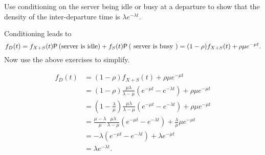 \begin{extra}\label{ex:63}
Use conditioning on the server being idle or busy at a departure to show that  the density of  the inter-departure time is $\lambda e^{-\lambda t}$.
  \begin{hint}
Conditioning leads to 
\begin{equation*}
    f_D(t) = f_{X+S}(t) \P{\text{server is idle}} + f_S(t) \P{\text{ server is busy }}= (1-\rho) f_{X+S}(t) +
    \rho \mu e^{-\mu t}.
\end{equation*}
    Now use the above exercises to simplify.
  \end{hint}
  \begin{solution}
       \begin{align*}
    f_D(t) 
&= (1-\rho) f_{X+S}(t) +    \rho \mu e^{-\mu t} \\
&= (1-\rho) \frac{\mu\lambda}{\lambda-\mu} \left(e^{-\mu t}-e^{-\lambda t}\right) +    \rho \mu e^{-\mu t} \\
&= \left(1-\frac{\lambda}\mu\right) \frac{\mu\lambda}{\lambda-\mu}\left(e^{-\mu t}-e^{-\lambda t}\right)  +    \rho \mu e^{-\mu t} \\
&= \frac{\mu-\lambda}\mu \frac{\mu\lambda}{\lambda-\mu}\left(e^{-\mu t}-e^{-\lambda t}\right)  +    \frac\lambda \mu \mu e^{-\mu t} \\
&= - \lambda\left(e^{-\mu t}-e^{-\lambda t}\right)  +    \lambda e^{-\mu t} \\
&=  \lambda e^{-\lambda t}.
      \end{align*}
  \end{solution}
\end{extra}






